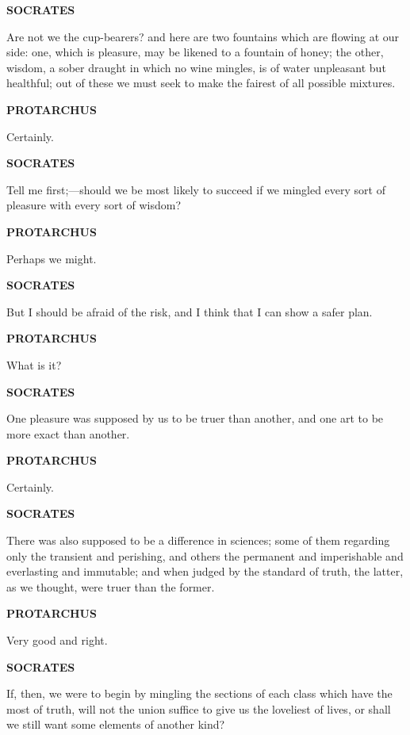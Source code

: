 \documentclass[11pt,letter]{article}
\begin{document}
\par \textbf{SOCRATES}
\par   Are not we the cup-bearers? and here are two fountains which are flowing at our side:  one, which is pleasure, may be likened to a fountain of honey; the other, wisdom, a sober draught in which no wine mingles, is of water unpleasant but healthful; out of these we must seek to make the fairest of all possible mixtures.

\par \textbf{PROTARCHUS}
\par   Certainly.

\par \textbf{SOCRATES}
\par   Tell me first;—should we be most likely to succeed if we mingled every sort of pleasure with every sort of wisdom?

\par \textbf{PROTARCHUS}
\par   Perhaps we might.

\par \textbf{SOCRATES}
\par   But I should be afraid of the risk, and I think that I can show a safer plan.

\par \textbf{PROTARCHUS}
\par   What is it?

\par \textbf{SOCRATES}
\par   One pleasure was supposed by us to be truer than another, and one art to be more exact than another.

\par \textbf{PROTARCHUS}
\par   Certainly.

\par \textbf{SOCRATES}
\par   There was also supposed to be a difference in sciences; some of them regarding only the transient and perishing, and others the permanent and imperishable and everlasting and immutable; and when judged by the standard of truth, the latter, as we thought, were truer than the former.

\par \textbf{PROTARCHUS}
\par   Very good and right.

\par \textbf{SOCRATES}
\par   If, then, we were to begin by mingling the sections of each class which have the most of truth, will not the union suffice to give us the loveliest of lives, or shall we still want some elements of another kind?
\end{document}
